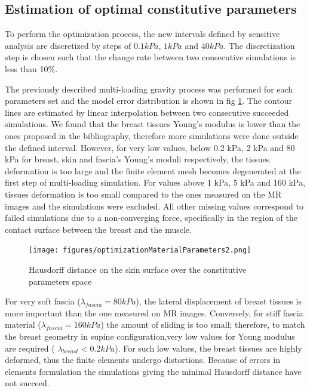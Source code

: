 \subsection{Estimation of optimal constitutive parameters}
To perform the optimization process, the new intervals defined by sensitive analysis are discretized by steps of $0.1 kPa$, $1kPa$ and $40 kPa$. The discretization step is chosen such that the change rate between two consecutive simulations is less than 10\%.

The previously described multi-loading gravity process was performed for each parameters set and the model error distribution is shown in fig \ref{fig:optimizationresults}. The contour lines are estimated by linear interpolation between two consecutive succeeded simulations. We found that the breast tissues Young's modulus is lower than the ones proposed in the bibliography, therefore more simulations were done outside the defined interval. However, for very low values, below 0.2 kPa, 2 kPa and 80 kPa for breast, skin and fascia's Young's moduli respectively, the tissues deformation is too large and the finite element mesh becomes degenerated at the first step of multi-loading simulation. For values above 1 kPa, 5 kPa and 160 kPa, tissues deformation is too small compared to the ones measured on the MR images and the simulations were excluded. All other missing values correspond to failed simulations due to a non-converging force, specifically in the region of the contact surface between the breast and the muscle.

\begin{figure}[!h]
\centering
\texttt{[image: figures/optimizationMaterialParameters2.png]} 
\caption{Hausdorff distance on the skin surface over the constitutive parameters space}\label{fig:optimizationresults}
\end{figure}

 

For very soft fascia ($\lambda_{fascia} = 80kPa$), the lateral displacement of breast tissues is more important than the one measured on MR images. Conversely, for stiff fascia material ($\lambda_{fascia}=160 kPa$) the amount of sliding is too small; therefore, to match the breast geometry in supine configuration,very low values for Young modulus are required ( $\lambda_{breast}< 0.2kPa$). For such low values, the breast tissues are highly deformed, thus the finite elements undergo distortions. Because of errors in elements formulation the simulations giving the minimal Hausdorff distance have not succeed.   

